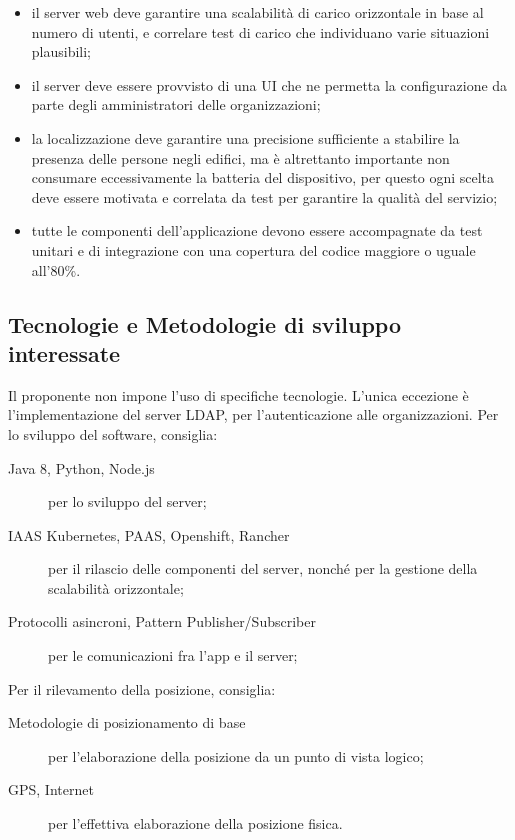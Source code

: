 \documentclass[../studio-di-fattibilita.tex]{subfiles}
\begin{document}
\begin{itemize}
    \item il server web deve garantire una scalabilità di carico orizzontale in base al numero di utenti, e correlare test di carico che individuano varie situazioni plausibili;
    \item il server deve essere provvisto di una UI che ne permetta la configurazione da parte degli amministratori delle organizzazioni;
    \item la localizzazione deve garantire una precisione sufficiente a stabilire la presenza delle persone negli edifici, ma è altrettanto importante non consumare eccessivamente la batteria del dispositivo, per questo ogni scelta deve essere motivata e correlata da test per garantire la qualità del servizio;
    \item tutte le componenti dell’applicazione devono essere accompagnate da test unitari e di integrazione con una copertura del codice maggiore o uguale all'80\%.
  \end{itemize}


  \subsection{Tecnologie e Metodologie di sviluppo interessate}%
  \label{subsec:tecnologie_interessate}
  Il proponente non impone l'uso di specifiche tecnologie. L'unica eccezione è l'implementazione del server LDAP, per l'autenticazione alle organizzazioni.
  Per lo sviluppo del software, consiglia:
  \begin{description}
    \item[Java 8, Python, Node.js] per lo sviluppo del server;
    \item[IAAS Kubernetes, PAAS, Openshift, Rancher] per il rilascio delle componenti del server, nonché per la gestione della scalabilità orizzontale;
    \item[Protocolli asincroni, Pattern Publisher/Subscriber] per le comunicazioni fra l'app e il server;
  \end{description}

  Per il rilevamento della posizione, consiglia:
  \begin{description}
    \item[Metodologie di posizionamento di base] per l'elaborazione della posizione da un punto di vista logico;
    \item[GPS, Internet] per l'effettiva elaborazione della posizione fisica.
  \end{description}
\end{document}

